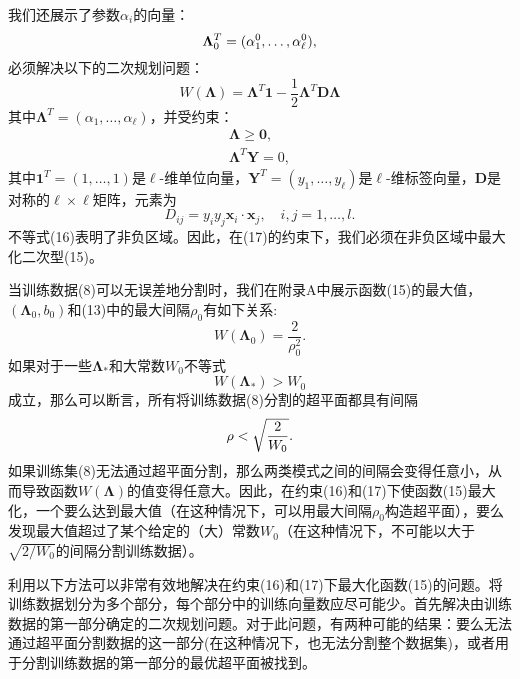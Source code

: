 \documentclass[lang=cn,11pt,a4paper]{elegantpaper}
\begin{document}
	我们还展示了参数$\alpha_i$的向量：
	\begin{equation}
		\mathbf{\Lambda}_0^T=(\alpha_1^0,\dots,\alpha_\ell^0),\notag
	\end{equation}
	必须解决以下的二次规划问题：
	\begin{equation}
		W(\mathbf{\Lambda})=\mathbf{\Lambda}^T\mathbf{1}-\frac{1}{2}\mathbf{\Lambda}^T\mathbf{D\Lambda}\tag{15}
	\end{equation}
	其中$\mathbf{\Lambda}^T=(\alpha_1,\dots,\alpha_\ell)$，并受约束：
	\begin{align}
		\mathbf{\Lambda}\geq\mathbf{0},\tag{16}\\ 
		\mathbf{\Lambda}^T\mathbf{Y}=0,\tag{17}
	\end{align}
	其中$\mathbf{1}^T=(1,\dots,1)$是$\ell$-维单位向量，$\mathbf{Y}^T=(y_1,\dots,y_\ell)$是$\ell$-维标签向量，$\mathbf{D}$是对称的$\ell\times\ell$矩阵，元素为
	\begin{equation}
		D_{ij}=y_iy_j\mathbf{x}_i·\mathbf{x}_j,\quad i,j=1,\dots,l.\tag{18}
	\end{equation}
	不等式(16)表明了非负区域。因此，在(17)的约束下，我们必须在非负区域中最大化二次型(15)。

	当训练数据(8)可以无误差地分割时，我们在附录A中展示函数(15)的最大值，$(\mathbf{\Lambda}_0,b_0)$和(13)中的最大间隔$\rho_0$有如下关系:
	\begin{equation}
		W(\mathbf{\Lambda}_0)=\frac{2}{\rho_0^2}.\tag{19}
	\end{equation}
	如果对于一些$\mathbf{\Lambda}_*$和大常数$W_0$不等式
	\begin{equation}
		W(\mathbf{\Lambda}_*)> W_0\tag{20}
	\end{equation}
	成立，那么可以断言，所有将训练数据(8)分割的超平面都具有间隔
	\begin{equation}
		\rho< \sqrt{\frac{2}{W_0}}.\notag
	\end{equation}
	如果训练集(8)无法通过超平面分割，那么两类模式之间的间隔会变得任意小，从而导致函数$W(\mathbf{\Lambda})$的值变得任意大。因此，在约束(16)和(17)下使函数(15)最大化，一个要么达到最大值（在这种情况下，可以用最大间隔$\rho_0$构造超平面），要么发现最大值超过了某个给定的（大）常数$W_0$（在这种情况下，不可能以大于$\sqrt{2/W_0}$的间隔分割训练数据）。

	利用以下方法可以非常有效地解决在约束(16)和(17)下最大化函数(15)的问题。将训练数据划分为多个部分，每个部分中的训练向量数应尽可能少。首先解决由训练数据的第一部分确定的二次规划问题。对于此问题，有两种可能的结果：要么无法通过超平面分割数据的这一部分(在这种情况下，也无法分割整个数据集)，或者用于分割训练数据的第一部分的最优超平面被找到。
\end{document}
